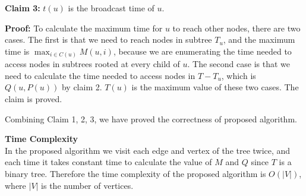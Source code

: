 \documentclass{article}
\newcommand{\Complexity}{\vspace{0.3cm} \noindent\textbf{Time Complexity} \vspace{0.2cm} \\}
\begin{document}
\textbf{Claim 3:} $t(u)$ is the broadcast time of $u$.

\textbf{Proof:}
To calculate the maximum time for $u$ to reach other nodes, there are two cases. The first is that
we need to reach nodes in subtree $T_u$, and the maximum time is $\max_{i \in C(u)} M(u, i)$,
because we are enumerating the time needed to access nodes in subtrees rooted at every child of $u$.
The second case is that we need to calculate the time needed to access nodes in $T - T_u$, which is 
$Q(u, P(u))$ by claim 2. $T(u)$ is the maximum value of these two cases. The claim is proved.

Combining Claim 1, 2, 3, we have proved the correctness of proposed algorithm.

\Complexity
In the proposed algorithm we visit each edge and vertex of the tree twice, and each time it takes
constant time to calculate the value of $M$ and $Q$ since $T$ is a binary tree. Therefore the time
complexity of the proposed algorithm is $O(|V|)$, where $|V|$ is the number of vertices.   
\end{document}
